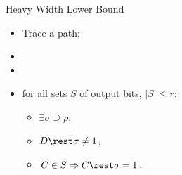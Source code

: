 \begin{frame}{Heavy Width Lower Bound}

    \begin{minipage}{0.6\linewidth}
        \centering
        
    \end{minipage}
    \pause
    \begin{minipage}{0.35\linewidth}
        \vspace{0.5cm}
        \begin{itemize}
            \item Trace a path;
                \pause
                \pause
            \item {}
                \pause
            \item {}
                \pause
                \vspace{0.3cm}
                \pause
            \item for all sets $S$ of output bits, $|S| \le r$:
                \begin{itemize}
                    \item $\exists \sigma \supseteq \rho$;
                    \item $D \rest \sigma \neq 1$;
                    \item $C \in S \Rightarrow
                        C \rest \sigma = 1$.
                \end{itemize}
        \end{itemize}
    \end{minipage}


\end{frame}
